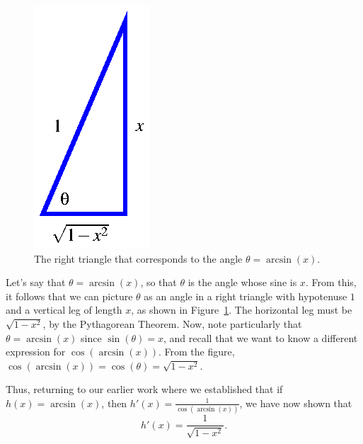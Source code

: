 \begin{figure}[h]
\begin{center}
\includegraphics{figures/2_6_cosarcsin.eps}
\caption{The right triangle that corresponds to the angle $\theta = \arcsin(x)$.} \label{F:2.6.cosarcsin}
\end{center}
\end{figure}

Let's say that $\theta = \arcsin(x)$, so that $\theta$ is the angle whose sine is $x$.  From this, it follows that we can picture $\theta$ as an angle in a right triangle with hypotenuse $1$ and a vertical leg of length $x$, as shown in Figure~\ref{F:2.6.cosarcsin}.  The horizontal leg must be $\sqrt{1-x^2}$, by the Pythagorean Theorem.  Now, note particularly that $\theta = \arcsin(x)$ since $\sin(\theta) = x$, and recall that we want to know a different expression for $\cos(\arcsin(x))$.  From the figure, $\cos(\arcsin(x)) = \cos(\theta) = \sqrt{1-x^2}.$

Thus, returning to our earlier work where we established that if $h(x) = \arcsin(x)$, then $h'(x) = \frac{1}{\cos(\arcsin(x))}$, we have now shown that
$$h'(x) = \frac{1}{\sqrt{1-x^2}}.$$

\vspace*{5pt}
\nin {}
\vspace*{1pt}




